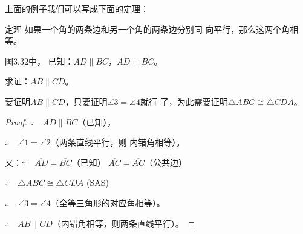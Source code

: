 \begin{figure}
    \begin{minipage}[t]{0.48\linewidth}
    \centering
\begin{tikzpicture}[>=latex, scale=1, rotate=-20]

    \end{tikzpicture}
    \caption{}
    \end{minipage}
    \begin{minipage}[t]{0.48\linewidth}
    \centering
    \begin{tikzpicture}[>=latex, scale=1]

    \end{tikzpicture}
    \caption{}
    \end{minipage}
    \end{figure}

上面的例子我们可以写成下面的定理：

\begin{Theorem}
    {定理} 如果一个角的两条边和另一个角的两条边分别同
向平行，那么这两个角相等。
\end{Theorem}

\begin{example}
    图3.32中，
    已知：$AD\parallel BC$，$\overline{AD}=\overline{BC}$。

    求证：$AB\parallel CD$。
\end{example}

\begin{analyze}
    要证明$AB\parallel CD$，只要证明$\angle 3=\angle 4$就行
了，为此需要证明$\triangle ABC\cong \triangle CDA$。
\end{analyze}

\begin{proof}
$\because\quad AD\parallel BC$（已知），

$\therefore\quad \angle 1=\angle 2$（两条直线平行，则
内错角相等）。

又：$\because\quad \overline{AD}=\overline{BC}$（已知）
$\overline{AC}=\overline{AC}$（公共边）

$\therefore\quad \triangle ABC\cong \triangle CDA$ (SAS)

$\therefore\quad \angle  3=\angle 4$（全等三角形的对应角相等）。

$\therefore\quad AB\parallel CD$（内错角相等，则两条直线平行）。
\end{proof}

